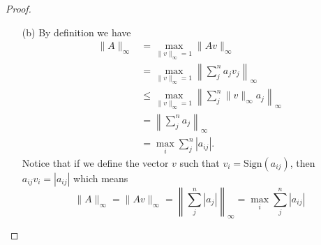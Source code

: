\documentclass[12pt]{report}
\begin{document}
\begin{problem}
\begin{proof}
\begin{enumerate}
    \item [(b)]
    By definition we have
    \begin{align*}
        \| A \|_\infty &= \max_{\|v\|_\infty = 1 }\| Av \|_\infty\\
        &= \max_{\|v\|_\infty = 1 }\left\| \sum_j^n a_jv_j   \right\|_\infty\\
        &\leq \max_{\|v\|_\infty = 1}  \left\| \sum_j^n \|v\|_\infty a_j  \right\|_\infty\\
        &= \left\| \sum_j^n a_j \right\|_\infty\\
        &= \max_i \sum_j^n |a_{ij}|.
    \end{align*}
    Notice that if we define the vector $v$ such that $v_i = \text{Sign}(a_{ij})$, then $a_{ij}v_i = |a_{ij}|$ which means
    \[
        \| A \|_\infty = \|Av\|_\infty = \left\| \sum_j^n |a_j| \right\|_\infty = \max_i \sum_j^n|a_{ij}|
    \] 


\end{enumerate}

\end{proof}
\end{problem}




\end{document}
